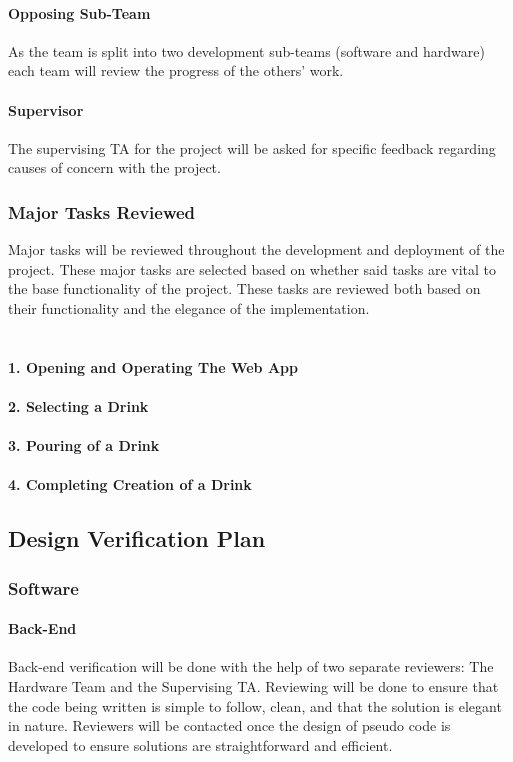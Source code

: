 \documentclass[12pt, titlepage]{article}
\begin{document}
\paragraph{Opposing Sub-Team}
\newline
As the team is split into two development sub-teams  (software and hardware) each team will review the progress of the others' work.

\paragraph{Supervisor}\newline
The supervising TA for the project will be asked for specific feedback regarding causes of concern with the project.

\subsubsection{Major Tasks Reviewed}
Major tasks will be reviewed throughout the development and deployment of the project. These major tasks are selected based on whether said tasks are vital to the base functionality of the project. These tasks are reviewed both based on their functionality and the elegance of the implementation.\\

\\\\ \indent \textbf{1. Opening and Operating The Web App}
\\\\ \indent \textbf{2. Selecting a Drink}
\\\\ \indent \textbf{3. Pouring of a Drink}
\\\\ \indent \textbf{4. Completing Creation of a Drink}

\subsection{Design Verification Plan}
\subsubsection{Software}
\paragraph{Back-End} Back-end verification will be done with the help of two separate reviewers: The Hardware Team and the Supervising TA. Reviewing will be done to ensure that the code being written is simple to follow, clean, and that the solution is elegant in nature. Reviewers will be contacted once the design of pseudo code is developed to ensure solutions are straightforward and efficient.
\end{document}

